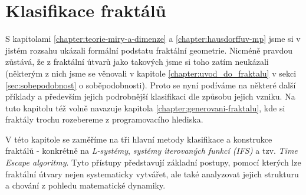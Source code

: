 \chapter{Klasifikace fraktálů}\label{chapter:klasifikace-fraktalu}

S kapitolami \ref{chapter:teorie-miry-a-dimenze} a \ref{chapter:hausdorffuv-mp} jsme si v jistém rozsahu ukázali formální podstatu fraktální geometrie. Nicméně pravdou zůstává, že z fraktální útvarů jako takových jsme si toho zatím neukázali (některým z nich jsme se věnovali v kapitole \ref{chapter:uvod_do_fraktalu} v sekci \ref{sec:sobepodobnost} o soběpodobnosti). Proto se nyní podíváme na některé další příklady a především jejich podrobnější klasifikaci dle způsobu jejich vzniku. Na tuto kapitolu též volně navazuje kapitola \ref{chapter:generovani-fraktalu}, kde si fraktály trochu rozebereme z programovacího hlediska.

V této kapitole se zaměříme na tři hlavní metody klasifikace a konstrukce fraktálů - konkrétně na \emph{L-systémy}, \emph{systémy iterovaných funkcí (IFS)} a tzv. \emph{Time Escape algoritmy}. Tyto přístupy představují základní postupy, pomocí kterých lze fraktální útvary nejen systematicky vytvářet, ale také analyzovat jejich strukturu a chování z pohledu matematické dynamiky.



